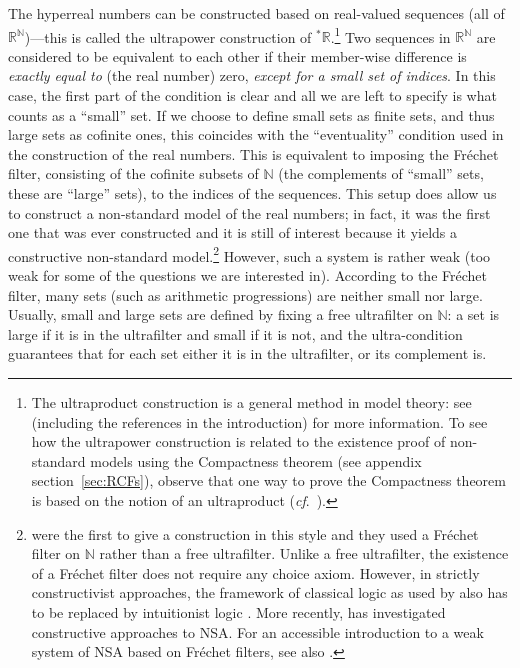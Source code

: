 The hyperreal numbers can be constructed based on real-valued sequences (all of $\mathbb{R}^\mathbb{N}$)---this is called the ultrapower construction of ${^\ast\mathbb{R}}$.\footnote{The ultraproduct construction is a general method in model theory: see \citet{Keisler:2010} (including the references in the introduction) for more information. To see how the ultrapower construction is related to the existence proof of non-standard models using the Compactness theorem (see appendix section~\ref{sec:RCFs}), observe that one way to prove the Compactness theorem is based on the notion of an ultraproduct (\textit{cf}.\ \citealp[p.~11]{Goldblatt:1998}).} Two sequences in $\mathbb{R}^\mathbb{N}$ are considered to be equivalent to each other if their member-wise difference is \textit{exactly equal to} (the real number) zero, \textit{except for a small set of indices}. In this case, the first part of the condition is clear and all we are left to specify is what counts as a ``small'' set. If we choose to define small sets as finite sets, and thus large sets as cofinite ones, this coincides with the ``eventuality'' condition used in the construction of the real numbers. This is equivalent to imposing the Fr\'{e}chet filter, consisting of the cofinite subsets of $\mathbb{N}$ (the complements of ``small'' sets, these are ``large'' sets), to the indices of the sequences. This setup does allow us to construct a non-standard model of the real numbers; in fact, it was the first one that was ever constructed and it is still of interest because it yields a constructive non-standard model.\footnote{\citet{SchmiedenLaugwitz:1958} were the first to give a construction in this style and they used a Fr\'{e}chet filter on $\mathbb{N}$ rather than a free ultrafilter. Unlike a free ultrafilter, the existence of a Fr\'{e}chet filter does not require any choice axiom. However, in strictly constructivist approaches, the framework of classical logic as used by \citet{SchmiedenLaugwitz:1958} also has to be replaced by intuitionist logic \citep{Martin-Lof:1990}. More recently, \citet{Palmgren:1998} has investigated constructive approaches to NSA. For an accessible introduction to a weak system of NSA based on Fr\'{e}chet filters, see also \citet{Tao:2012}.} However, such a system is rather weak (too weak for some of the questions we are interested in). According to the Fr\'{e}chet filter, many sets (such as arithmetic progressions) are neither small nor large. Usually, small and large sets are defined by fixing a free ultrafilter on $\mathbb{N}$: a set is large if it is in the ultrafilter and small if it is not, and the ultra-condition guarantees that for each set either it is in the ultrafilter, or its complement is.

